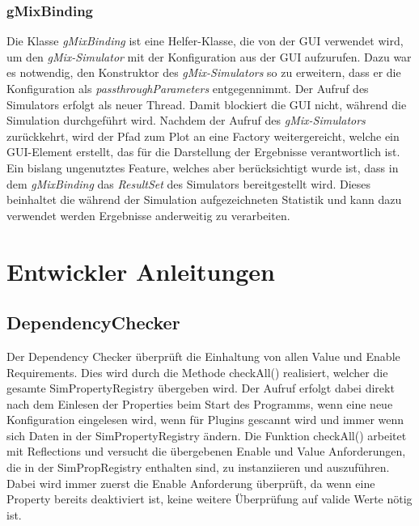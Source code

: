 \documentclass[a4paper, 11pt]{article} %
\begin{document}
\subsubsection{gMixBinding} %
\label{ssub:gmixbinding}
Die Klasse \emph{gMixBinding} ist eine Helfer-Klasse, die von der GUI verwendet wird, um den \emph{gMix-Simulator} mit der Konfiguration aus der GUI aufzurufen. Dazu war es notwendig, den Konstruktor des \emph{gMix-Simulators} so zu erweitern, dass er die Konfiguration als \emph{passthroughParameters} entgegennimmt. Der Aufruf des Simulators erfolgt als neuer Thread. Damit blockiert die GUI nicht, während die Simulation durchgeführt wird. Nachdem der Aufruf des \emph{gMix-Simulators} zurückkehrt, wird der Pfad zum Plot an eine Factory weitergereicht, welche ein GUI-Element erstellt, das für die Darstellung der Ergebnisse verantwortlich ist.\\

Ein bislang ungenutztes Feature, welches aber berücksichtigt wurde ist, dass in dem \emph{gMixBinding} das \emph{ResultSet} des Simulators bereitgestellt wird. Dieses beinhaltet die während der Simulation aufgezeichneten Statistik und kann dazu verwendet werden Ergebnisse anderweitig zu verarbeiten.\\

\section{Entwickler Anleitungen} %
\label{sec:entwicklung}
\subsection{DependencyChecker}
\label{ssub:dependencychecker}
Der Dependency Checker überprüft die Einhaltung von allen Value und Enable Requirements. Dies wird durch die Methode checkAll() realisiert, welcher die gesamte SimPropertyRegistry übergeben wird. Der Aufruf erfolgt dabei direkt nach dem Einlesen der Properties beim Start des Programms, wenn eine neue Konfiguration eingelesen wird, wenn für Plugins gescannt wird und immer wenn sich Daten in der SimPropertyRegistry ändern.
Die Funktion checkAll() arbeitet mit Reflections und versucht die übergebenen Enable und Value Anforderungen, die in der SimPropRegistry enthalten sind, zu instanziieren und auszuführen.\\

Dabei wird immer zuerst die Enable Anforderung überprüft, da wenn eine Property bereits deaktiviert ist, keine weitere Überprüfung auf valide Werte nötig ist.
\end{document}
